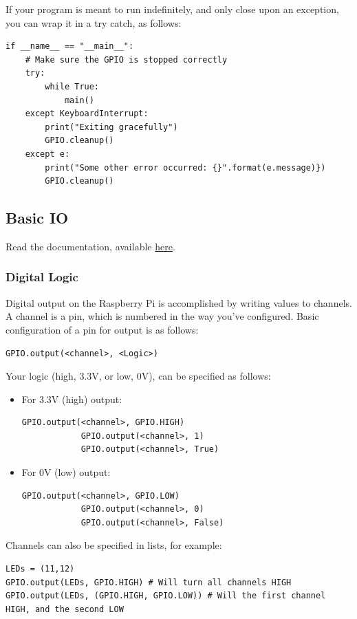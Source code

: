 If your program is meant to run indefinitely, and only close upon an exception, you can wrap it in a try catch, as follows:
\begin{lstlisting}
if __name__ == "__main__":
	# Make sure the GPIO is stopped correctly
	try:
	    while True:
		    main()
	except KeyboardInterrupt:
		print("Exiting gracefully")
		GPIO.cleanup()
	except e:
		print("Some other error occurred: {}".format(e.message)})
		GPIO.cleanup()
\end{lstlisting}


\subsection{Basic IO}
Read the documentation, available \href{https://sourceforge.net/p/raspberry-gpio-python/wiki/Outputs/}{here}.

\subsubsection{Digital Logic}
Digital output on the Raspberry Pi is accomplished by writing values to channels. A channel is a pin, which is numbered in the way you've configured. 
Basic configuration of a pin for output is as follows:
\begin{lstlisting}
GPIO.output(<channel>, <Logic>)
\end{lstlisting}
Your logic (high, 3.3V, or low, 0V), can be specified as follows:
\begin{itemize}
    \item For 3.3V (high) output:
        \begin{lstlisting}[gobble=12]
            GPIO.output(<channel>, GPIO.HIGH)
            GPIO.output(<channel>, 1)
            GPIO.output(<channel>, True)
        \end{lstlisting}
    \item For 0V (low) output:
    \begin{lstlisting}[gobble=12]
            GPIO.output(<channel>, GPIO.LOW)
            GPIO.output(<channel>, 0)
            GPIO.output(<channel>, False)
        \end{lstlisting}
\end{itemize}

Channels can also be specified in lists, for example:
\begin{lstlisting}
LEDs = (11,12)
GPIO.output(LEDs, GPIO.HIGH) # Will turn all channels HIGH
GPIO.output(LEDs, (GPIO.HIGH, GPIO.LOW)) # Will the first channel HIGH, and the second LOW
\end{lstlisting}

